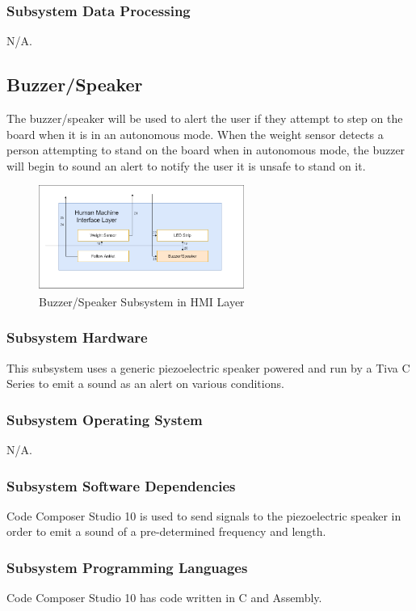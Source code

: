 \subsubsection{Subsystem Data Processing}
N/A.

\subsection{Buzzer/Speaker}
The buzzer/speaker will be used to alert the user if they attempt to step on the board when it is in an autonomous mode. When the weight sensor detects a person attempting to stand on the board when in autonomous mode, the buzzer will begin to sound an alert to notify the user it is unsafe to stand on it.

\begin{figure}[h!]
	\centering
 	\includegraphics[width=0.60\textwidth]{images/Kendall/Buzzer.png}
 \caption{Buzzer/Speaker Subsystem in HMI Layer}
\end{figure}

\subsubsection{Subsystem Hardware}
This subsystem uses a generic piezoelectric speaker powered and run by a Tiva C Series to emit a sound as an alert on various conditions.

\subsubsection{Subsystem Operating System}
N/A.

\subsubsection{Subsystem Software Dependencies}
Code Composer Studio 10 is used to send signals to the piezoelectric speaker in order to emit a sound of a pre-determined frequency and length.

\subsubsection{Subsystem Programming Languages}
Code Composer Studio 10 has code written in C and Assembly.

